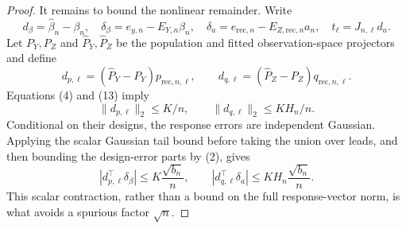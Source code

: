 \documentclass{article}
\begin{document}
\begin{proof}
It remains to bound the nonlinear remainder.  Write
\[
 d_\beta=\widehat\beta_n-\beta_n,\quad
 \delta_\beta=e_{y,n}-E_{Y,n}\beta_n,\quad
 \delta_a=e_{\mathrm{rec},n}-E_{Z,\mathrm{rec},n}a_n,\quad
 t_\ell=J_{n,\ell}d_a.
\]
Let \(P_Y,P_Z\) and \(\widehat P_Y,\widehat P_Z\) be the population and fitted observation-space projectors and define
\[
 d_{p,\ell}=(\widehat P_Y-P_Y)p_{\mathrm{rec},n,\ell},\qquad
 d_{q,\ell}=(\widehat P_Z-P_Z)q_{\mathrm{rec},n,\ell}.
\]
Equations (4) and (13) imply
\[
 \|d_{p,\ell}\|_2\le K/n,\qquad
 \|d_{q,\ell}\|_2\le KH_n/n.
 \tag{23}
\]
Conditional on their designs, the response errors are independent Gaussian.  Applying the scalar Gaussian tail bound before taking the union over leads, and then bounding the design-error parts by (2), gives
\[
 |d_{p,\ell}^\top\delta_\beta|\le K\frac{\sqrt{b_n}}n,\qquad
 |d_{q,\ell}^\top\delta_a|\le KH_n\frac{\sqrt{b_n}}n.
 \tag{24}
\]
This scalar contraction, rather than a bound on the full response-vector norm, is what avoids a spurious factor \(\sqrt n\).


\end{proof}
\end{document}
